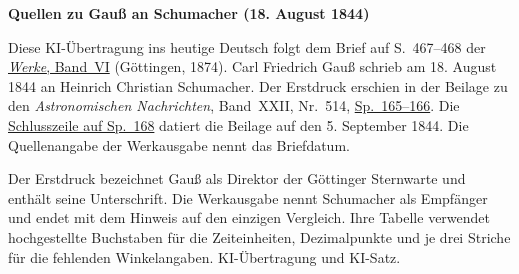 \clearpage\thispagestyle{empty}
\begin{center}\textbf{Quellen zu Gauß an Schumacher (18. August 1844)}\end{center}
\noindent Diese KI-Übertragung ins heutige Deutsch folgt dem Brief auf S.~467--468 der \href{https://gdz.sub.uni-goettingen.de/id/PPN236007467}{\textit{Werke}, Band~VI} (Göttingen, 1874). Carl Friedrich Gauß schrieb am 18. August 1844 an Heinrich Christian Schumacher. Der Erstdruck erschien in der Beilage zu den \textit{Astronomischen Nachrichten}, Band~XXII, Nr.~514, \href{https://api.digitale-sammlungen.de/iiif/image/v2/bsb10049447_00091/full/1800,/0/default.jpg}{Sp.~165--166}. Die \href{https://api.digitale-sammlungen.de/iiif/image/v2/bsb10049447_00092/full/1800,/0/default.jpg}{Schlusszeile auf Sp.~168} datiert die Beilage auf den 5. September 1844. Die Quellenangabe der Werkausgabe nennt das Briefdatum.
\par\smallskip\noindent Der Erstdruck bezeichnet Gauß als Direktor der Göttinger Sternwarte und enthält seine Unterschrift. Die Werkausgabe nennt Schumacher als Empfänger und endet mit dem Hinweis auf den einzigen Vergleich. Ihre Tabelle verwendet hochgestellte Buchstaben für die Zeiteinheiten, Dezimalpunkte und je drei Striche für die fehlenden Winkelangaben. KI-Übertragung und KI-Satz.
\clearpage
